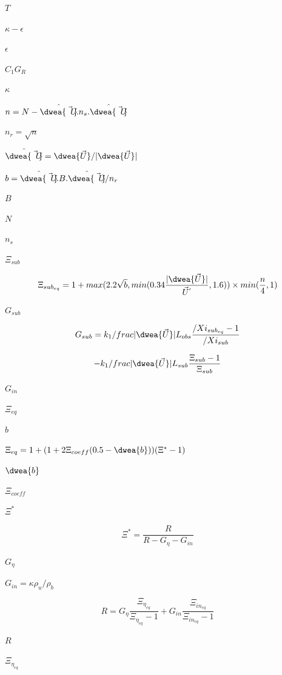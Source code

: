 \documentclass{article}
\begin{document}
$ T $
\pagebreak

$ \kappa-\epsilon
$
\pagebreak

$ \epsilon  $
\pagebreak

$ C_{1} G_{R} $
\pagebreak

$ \kappa $
\pagebreak

$ n = N - \hat{\dwea{\vec{U}}}.n_{s}.\hat{\dwea{\vec{U}}} $
\pagebreak

$ n_{r} = \sqrt{n} $
\pagebreak

$ \hat{\dwea{\vec{U}}} = \dwea{\vec{U}} / \vert \dwea{\vec{U}}
    \vert $
\pagebreak

$ b = \hat{\dwea{\vec{U}}}.B.\hat{\dwea{\vec{U}}} / n_{r} $
\pagebreak

$ B $
\pagebreak

$ N $
\pagebreak

$  n_{s} $
\pagebreak

$ \Xi_{sub} $
\pagebreak

\[
    \Xi_{{sub}_{eq}} =
        1 + max(2.2 \sqrt{b}, min(0.34 \frac{\vert \dwea{\vec{U}}
        \vert}{{\vec{U}}^{'}}, 1.6)) \times min(\frac{n}{4}, 1)
\]
\pagebreak

$ G_{sub} $
\pagebreak

\[
    G_{sub} = k_{1} /frac{\vert \dwea{\vec{U}} \vert}{L_{obs}}
             \frac{/Xi_{{sub}_{eq}}-1}{/Xi_{sub}}
\]
\pagebreak

\[
    - k_{1} /frac{\vert \dwea{\vec{U}} \vert}{L_{sub}}
    \frac{\Xi_{sub}-1}{\Xi_{sub}}
\]
\pagebreak

$ G_{in} $
\pagebreak

$\Xi_{eq}$
\pagebreak

$ b $
\pagebreak

$\Xi_{eq} = 1 + (1 + 2\Xi_{coeff}(0.5 - \dwea{b}))(\Xi^* - 1)$
\pagebreak

$ \dwea{b} $
\pagebreak

$ \Xi_{coeff} $
\pagebreak

$ \Xi^* $
\pagebreak

\[
        \Xi^* = \frac {R}{R - G_\eta - G_{in}}
    \]
\pagebreak

$ G_\eta $
\pagebreak

$ G_{in} = \kappa \rho_{u}/\rho_{b} $
\pagebreak

\[
        R = G_\eta \frac{\Xi_{\eta_{eq}}}{\Xi_{\eta_{eq}} - 1}
          + G_{in} \frac{\Xi_{{in}_{eq}}}{\Xi_{{in}_{eq}} - 1}
    \]
\pagebreak

$ R $
\pagebreak

$ \Xi_{\eta_{eq}} $
\pagebreak
\end{document}
